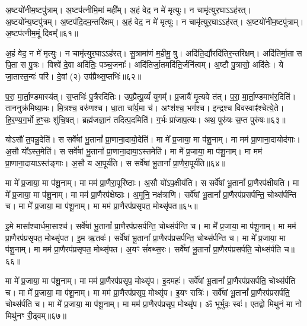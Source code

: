 \noindent [अप॑क्रामत गर्भि॒ण्यः॑]

अ॒ष्टयो॑नीम॒ष्टपु॑त्राम्। अ॒ष्टप॑त्नीमि॒मां मही᳚म्। 
अ॒हं वेद॒ न मे॑ मृत्युः। न चामृ॑त्युर॒घाऽऽह॑रत्। 
अ॒ष्टयो᳚न्य॒ष्टपु॑त्रम्। अ॒ष्टप॑दि॒दम॒न्तरि॑क्षम्। 
अ॒हं वेद॒ न मे॑ मृत्युः। न चामृ॑त्युर॒घाऽऽह॑रत्। 
अ॒ष्टयो॑नीम॒ष्टपु॑त्राम्। अ॒ष्टप॑त्नीम॒मूं दिवम्‌᳚॥६१॥


अ॒हं वेद॒ न मे॑ मृत्युः। न चामृ॑त्युर॒घाऽऽह॑रत्। 
सु॒त्रामा॑णं म॒हीमू॒ षु। अदि॑ति॒र्द्यौरदि॑तिर॒न्तरि॑क्षम्। 
अदि॑तिर्मा॒ता स पि॒ता स पु॒त्रः। विश्वे॑ दे॒वा अदि॑तिः॒ पञ्च\-॒जनाः᳚। 
अदि॑तिर्जा॒तमदि॑ति॒र्जनि॑त्वम्। अ॒ष्टौ पु॒त्रासो॒ अदि॑तेः। 
ये जा॒तास्त॒न्वः॑ परि॑। दे॒वां (२) उप॑प्रैथ्स॒प्तभिः॑॥६२॥


प॒रा॒ मा॒र्ता॒ण्डमास्य॑त्। स॒प्तभिः॑ पु॒त्रैरदि॑तिः। 
उप॒प्रैत्पू॒र्व्यं॑ युगम्᳚। प्र॒जायै॑ मृ॒त्यवे त॑त्। 
प॒रा॒ मा॒र्ता॒ण्डमाभ॑र॒दिति॑। ताननुक्र॑मिष्या॒मः। 
मि॒त्रश्च॒ वरु॑णश्च। धा॒ता चा᳚र्य॒मा च॑। 
अꣳश॑श्च॒ भग॑श्च। इन्द्रश्च विवस्वाꣴ॑श्चेत्ये॒ते। 
हि॒र॒ण्य॒ग॒र्भो ह॒ꣳ॒सः शु॑चि॒षत्। 
ब्रह्म॑जज्ञा॒नं तदित्प॒दमिति॑। ग॒र्भः प्रा॑जाप॒त्यः। 
अथ॒ पुरु॑षः स॒प्त पुरु॑षः॥६३॥

\noindent[य॒था॒स्था॒नं ग॑र्भि॒ण्यः॑]\anuvakamend

योऽसौ॑ त॒पन्नु॒देति॑। स सर्वे॑षां भू॒तानां᳚ प्रा॒णाना॒दायो॒देति॑। 
मा मे᳚ प्र॒जाया॒ मा प॑शू॒नाम्। मा मम॑ प्रा॒णाना॒दायोद॑गाः। 
अ॒सौ यो᳚ऽस्त॒मेति॑। स सर्वे॑षां भू॒तानां᳚ प्रा॒णाना॒दाया॒ऽस्तमेति॑। 
मा मे᳚ प्र॒जाया॒ मा प॑शू॒नाम्। मा मम॑ प्रा॒णाना॒दायाऽस्त॑ङ्गाः। 
अ॒सौ य आ॒पूर्य॑ति। स सर्वे॑षां भू॒तानां᳚ प्रा॒णैरा॒पूर्य॑ति॥६४॥


मा मे᳚ प्र॒जाया॒ मा प॑शू॒नाम्। मा मम॑ प्रा॒णैरा॒पूरि॑ष्ठाः। 
अ॒सौ यो॑ऽप॒क्षीय॑ति। स सर्वे॑षां भू॒तानां᳚ प्रा॒णैरप॑क्षीयति। 
मा मे᳚ प्र॒जाया॒ मा प॑शू॒नाम्। मा मम॑ प्रा॒णैरप॑क्षेष्ठाः। 
अ॒मूनि॒ नक्ष॑त्राणि। सर्वे॑षां भू॒तानां᳚ प्रा॒णैरप॑प्रसर्पन्ति॒ चोथ्स॑र्पन्ति च। 
मा मे᳚ प्र॒जाया॒ मा प॑शू॒नाम्। मा मम॑ प्रा॒णैरप॑प्रसृपत॒ मोथ्सृ॑पत॥६५॥


इ॒मे मासा᳚श्चार्धमा॒साश्च॑। सर्वे॑षां भू॒तानां᳚ प्रा॒णैरप॑प्रसर्पन्ति॒ चोथ्स॑र्पन्ति च। 
मा मे᳚ प्र॒जाया॒ मा प॑शू॒नाम्। मा मम॑ प्रा॒णैरप॑प्रसृपत॒ मोथ्सृ॑पत। 
इ॒म ऋ॒तवः॑। सर्वे॑षां भू॒तानां᳚ प्रा॒णैरप॑प्रसर्पन्ति॒ चोथ्स॑र्पन्ति च। 
मा मे᳚ प्र॒जाया॒ मा प॑शू॒नाम्। मा मम॑ प्रा॒णैरप॑प्रसृपत॒ मोथ्सृ॑पत। 
अ॒यꣳ सं॑वथ्स॒रः। सर्वे॑षां भू॒तानां᳚ प्रा॒णैरप॑प्रसर्पति॒ चोथ्स॑र्पति च॥६६॥


मा मे᳚ प्र॒जाया॒ मा प॑शू॒नाम्। मा मम॑ प्रा॒णैरप॑प्रसृप॒ मोथ्सृ॑प। 
इ॒दमहः॑। सर्वे॑षां भू॒तानां᳚ प्रा॒णैरप॑प्रसर्पति॒ चोथ्स॑र्पति च। 
मा मे᳚ प्र॒जाया॒ मा प॑शू॒नाम्। मा मम॑ प्रा॒णैरप॑प्रसृप॒ मोथ्सृ॑प। 
इ॒यꣳ रात्रिः॑। सर्वे॑षां भू॒तानां᳚ प्रा॒णैरप॑प्रसर्पति॒ चोथ्स॑र्पति च। 
मा मे᳚ प्र॒जाया॒ मा प॑शू॒नाम्। मा मम॑ प्रा॒णैरप॑प्रसृप॒ मोथ्सृ॑प। 
ॐ भूर्भुवः॒ स्वः॑। एतद्वो मिथुनं मा नो मिथु॑नꣳ री॒ढ्वम्॥६७॥\anuvakamend


